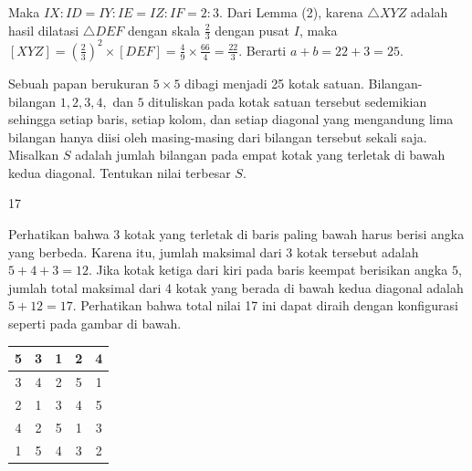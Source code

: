 \documentclass[12pt]{scrartcl}
\begin{document}
\begin{soaljawab}
\begin{solusi}
		Maka $IX:ID=IY:IE=IZ:IF=2:3$. Dari Lemma (2), karena $\triangle XYZ$ adalah hasil dilatasi $\triangle DEF$ dengan skala $\frac{2}{3}$ dengan pusat $I$, maka $[XYZ]=\left (\frac{2}{3}\right)^2\times [DEF]=\frac{4}{9}\times\frac{66}{4}=\frac{22}{3}.$ Berarti $a+b=22+3=25$.
		
		\end{solusi}
	\end{soaljawab}
	
	\begin{soaljawab}
		Sebuah papan berukuran $5 \times 5$ dibagi menjadi 25 kotak satuan. Bilangan-bilangan $1,2,3,4,$ dan $5$ dituliskan pada kotak satuan tersebut sedemikian sehingga setiap baris, setiap kolom, dan setiap diagonal yang mengandung lima bilangan hanya diisi oleh masing-masing dari bilangan tersebut sekali saja. Misalkan $S$ adalah jumlah bilangan pada empat kotak yang terletak di bawah kedua diagonal. Tentukan nilai terbesar $S$.
		
		\begin{jawaban}
		17
		\end{jawaban}
		\begin{solusi}
		Perhatikan bahwa 3 kotak yang terletak di baris paling bawah harus berisi angka yang berbeda. Karena itu, jumlah maksimal dari 3 kotak tersebut adalah $5+4+3=12$. Jika kotak ketiga dari kiri pada baris keempat berisikan angka $5$, jumlah total maksimal dari 4 kotak yang berada di bawah kedua diagonal adalah $5+12=17$. Perhatikan bahwa total nilai 17 ini dapat diraih dengan konfigurasi seperti pada gambar di bawah.
		\begin{center} 
		\begin{tabular}{ |c|c|c|c|c| }
			\hline
			5 & 3 & 1 & 2 & 4 \\
			\hline
			3 & 4 & 2 & 5 & 1 \\
			\hline
			2 & 1 & 3 & 4 & 5 \\
			\hline
			4 & 2 & \cellcolor{green!30}5 & 1 & 3 \\
			\hline
			1 &\cellcolor{green!30}5 &\cellcolor{green!30}4 &\cellcolor{green!30}3 & 2 \\
			\hline
		\end{tabular}
		\end{center}
		\end{solusi}
	\end{soaljawab}
		
\end{document}
